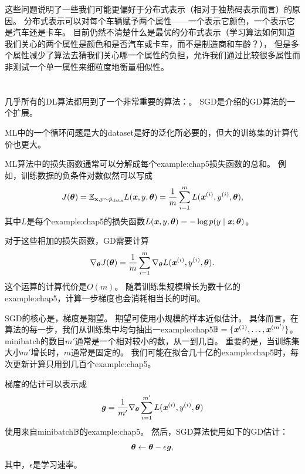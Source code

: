 
这些问题说明了一些我们可能更偏好于分布式表示（相对于独热码表示而言）的原因。
分布式表示可以对每个车辆赋予两个属性——一个表示它颜色，一个表示它是汽车还是卡车。
目前仍然不清楚什么是最优的分布式表示（学习算法如何知道我们关心的两个属性是颜色和是否汽车或卡车，而不是制造商和车龄？），
但是多个属性减少了算法去猜我们关心哪一个属性的负担，允许我们通过比较很多属性而非测试一个单一属性来细粒度地衡量相似性。

\section{}
\label{sec:stochastic_gradient_descent_chap5}
几乎所有的\gls{DL}算法都用到了一个非常重要的算法：。
\gls{SGD}是介绍的\gls{GD}算法的一个扩展。

\gls{ML}中的一个循环问题是大的\gls{dataset}是好的泛化所必要的，但大的训练集的计算代价也更大。


\gls{ML}算法中的损失函数通常可以分解成每个\gls{example:chap5}损失函数的总和。
例如，训练数据的负条件对数似然可以写成
\begin{equation}
    J(\boldsymbol{\theta}) = \mathbb{E}_{\mathbf{x},\mathrm{y} \sim \hat{p}_{\text{data}}}
    L(\boldsymbol{\mathit{x}}, y, \boldsymbol{\theta}) = 
    \frac{1}{m} \sum_{i=1}^m  L(\boldsymbol{\mathit{x}}^{(i)}, y^{(i)}, \boldsymbol{\theta}) ,
\end{equation}
其中$L$是每个\gls{example:chap5}的损失函数$L(\boldsymbol{\mathit{x}}, y, \boldsymbol{\theta}) = -\log p(y\mid\boldsymbol{\mathit{x}};\boldsymbol{\theta})$。

对于这些相加的损失函数，\gls{GD}需要计算
\begin{equation}
    \nabla_{\boldsymbol{\theta}} J(\boldsymbol{\theta})
    = \frac{1}{m} \sum_{i=1}^m  
    \nabla_{\boldsymbol{\theta}} L(\boldsymbol{\mathit{x}}^{(i)}, y^{(i)}, \boldsymbol{\theta}) .
\end{equation}
这个运算的计算代价是$O(m)$。
随着训练集规模增长为数十亿的\gls{example:chap5}，计算一步梯度也会消耗相当长的时间。

\gls{SGD}的核心是，梯度是期望。
期望可使用小规模的样本近似估计。
具体而言，在算法的每一步，我们从训练集中均匀抽出一\gls{example:chap5}$\mathbb{B}=\{\boldsymbol{\mathit{x}}^{(1)},\dots,\boldsymbol{\mathit{x}}^{(m')}\}$。
\gls{minibatch}的数目$m'$通常是一个相对较小的数，从一到几百。
重要的是，当训练集大小$m'$增长时，$m$通常是固定的。
我们可能在拟合几十亿的\gls{example:chap5}时，每次更新计算只用到几百个\gls{example:chap5}。

梯度的估计可以表示成
\begin{equation}
    \boldsymbol{\mathit{g}} = \frac{1}{m'} \nabla_{\boldsymbol{\theta}} \sum_{i=1}^{m'}
    L(\boldsymbol{\mathit{x}}^{(i)}, y^{(i)}, \boldsymbol{\theta})
\end{equation}
使用来自\gls{minibatch}$\mathbb{B}$的\gls{example:chap5}。
然后，\gls{SGD}算法使用如下的\gls{GD}估计：
\begin{equation}
    \boldsymbol{\theta} \leftarrow \boldsymbol{\theta} - \epsilon \boldsymbol{\mathit{g}},
\end{equation}
其中，$\epsilon$是学习速率。


